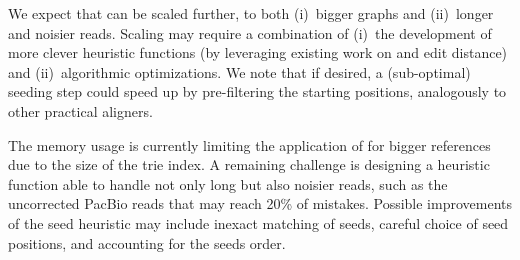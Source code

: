 We expect that \astarix can be scaled further, to both (i)~bigger graphs and
(ii)~longer and noisier reads. Scaling \astarix may require a combination of
(i)~the development of more clever heuristic functions (by leveraging existing
work on \A and edit distance) and (ii)~algorithmic optimizations. We note that
if desired, a (sub-optimal) seeding step could speed up \astarix by
pre-filtering the starting positions, analogously to other practical aligners.

The memory usage is currently limiting the application of \astarix for bigger
references due to the size of the trie index. A remaining challenge is designing
a heuristic function able to handle not only long but also noisier reads, such
as the uncorrected PacBio reads that may reach 20\% of mistakes. Possible
improvements of the seed heuristic may include inexact matching of seeds,
careful choice of seed positions, and accounting for the seeds order.

